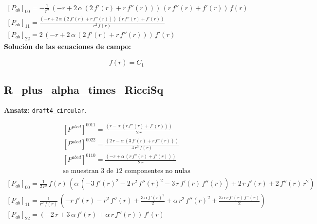\documentclass[10pt]{article}
\begin{document}
\[\begin{aligned}\left[P_{ab}\right]_{00}=-\frac{1}{{r}^{2}}\,\left(-r + 2\,\alpha\,\left(2\,f'\!\left(r\right) + r\,f''\!\left(r\right)\right)\right)\,\left(r\,f''\!\left(r\right) + f'\!\left(r\right)\right)\,f\!\left(r\right)\\[2pt]\left[P_{ab}\right]_{11}=\frac{\left(-r + 2\,\alpha\,\left(2\,f'\!\left(r\right) + r\,f''\!\left(r\right)\right)\right)\,\left(r\,f''\!\left(r\right) + f'\!\left(r\right)\right)}{{r}^{2}\,f\!\left(r\right)}\\[2pt]\left[P_{ab}\right]_{22}=2\,\left(-r + 2\,\alpha\,\left(2\,f'\!\left(r\right) + r\,f''\!\left(r\right)\right)\right)\,f'\!\left(r\right)\end{aligned}\]
\noindent\textbf{Solución de las ecuaciones de campo:}\par
\[\begin{aligned}f\!\left(r\right)=C_{1}\end{aligned}\]
\subsection*{R\_plus\_alpha\_times\_RicciSq}
\textbf{Ansatz:} \texttt{draft4\_circular}.\par
\[\begin{aligned}\left[P^{abcd}\right]^{0011}=\frac{\left(r - \alpha\,\left(r\,f''\!\left(r\right) + f'\!\left(r\right)\right)\right)}{2\,r}\\[2pt]\left[P^{abcd}\right]^{0022}=\frac{\left(2\,r - \alpha\,\left(3\,f'\!\left(r\right) + r\,f''\!\left(r\right)\right)\right)}{4\,{r}^{3}\,f\!\left(r\right)}\\[2pt]\left[P^{abcd}\right]^{0110}=\frac{\left(-r + \alpha\,\left(r\,f''\!\left(r\right) + f'\!\left(r\right)\right)\right)}{2\,r}\\[2pt]\text{se muestran 3 de 12 componentes no nulas}\end{aligned}\]
\[\begin{aligned}\left[P_{ab}\right]_{00}=\frac{1}{2\,{r}^{2}}\,f\!\left(r\right)\,\left(\alpha\,\left(-3\,{f'\!\left(r\right)}^{2} - 2\,{r}^{2}\,{f''\!\left(r\right)}^{2} - 3\,r\,f'\!\left(r\right)\,f''\!\left(r\right)\right) + 2\,r\,f'\!\left(r\right) + 2\,f''\!\left(r\right)\,{r}^{2}\right)\\[2pt]\left[P_{ab}\right]_{11}=\frac{1}{{r}^{2}\,f\!\left(r\right)}\,\left(-r\,f'\!\left(r\right) - {r}^{2}\,f''\!\left(r\right) + \frac{3\,\alpha\,{f'\!\left(r\right)}^{2}}{2} + \alpha\,{r}^{2}\,{f''\!\left(r\right)}^{2} + \frac{3\,\alpha\,r\,f'\!\left(r\right)\,f''\!\left(r\right)}{2}\right)\\[2pt]\left[P_{ab}\right]_{22}=\left(-2\,r + 3\,\alpha\,f'\!\left(r\right) + \alpha\,r\,f''\!\left(r\right)\right)\,f'\!\left(r\right)\end{aligned}\]
\end{document}
